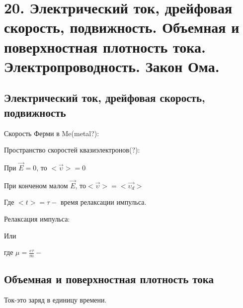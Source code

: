 \section*{20. Электрический ток, дрейфовая скорость, подвижность. Объемная и
поверхностная плотность тока. Электропроводность. Закон Ома.}

\subsection*{Электрический ток, дрейфовая скорость, подвижность}

Скорость Ферми в Me(metal?):



\newpage

Пространство скоростей квазиэлектронов(?):


При $\vec{E}=0\text{, то }<\vec{\upsilon}>=0$

При конченом малом $\vec{E}\text{, то} <\vec{\upsilon}>=<\vec{\upsilon_d}>$



Где $<t>=\tau-$ время релаксации импульса.

Релаксация импульса:

Или


где $\mu=\frac{e\tau }{m}-$

\newpage

\subsection*{Объемная и поверхностная плотность тока}

Ток-это заряд в единицу времени.

 


